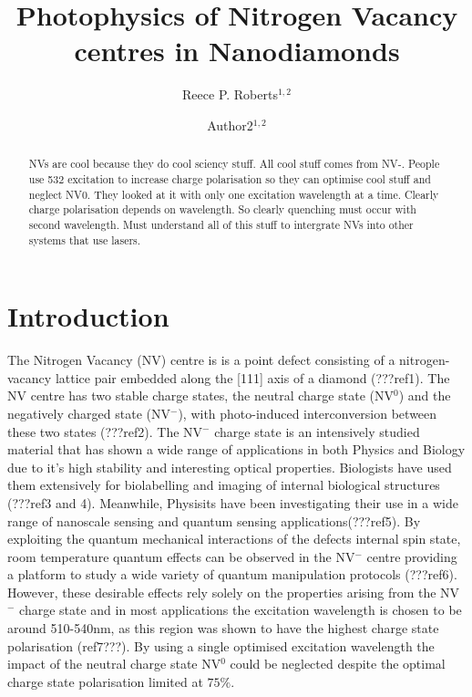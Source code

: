 \documentclass[preprint,prl,twocolumn]{revtex4}
\begin{document}
\title{Photophysics of Nitrogen Vacancy centres in Nanodiamonds}
  
\author{Reece P. Roberts$^{1,2}$}
\author{Author2$^{1,2}$}



\begin{abstract}
NVs are cool because they do cool sciency stuff.
All cool stuff comes from NV-.
People use 532 excitation to increase charge polarisation so they can optimise cool stuff and neglect NV0.
They looked at it with only one excitation wavelength at a time. 
Clearly charge polarisation depends on wavelength.
So clearly quenching must occur with second wavelength.
Must understand all of this stuff to intergrate NVs into other systems that use lasers.
\end{abstract}

\maketitle

\section{Introduction}
The Nitrogen Vacancy (NV) centre is is a point defect consisting of a nitrogen-vacancy lattice pair embedded along the [111] axis of a diamond (???ref1). The NV centre has two stable charge states, the neutral charge state (NV$^0$) and the negatively charged state (NV$^-$), with photo-induced interconversion between these two states (???ref2). The NV$^-$ charge state is an intensively studied material that has shown a wide range of applications in both Physics and Biology due to it's high stability and interesting optical properties. Biologists have used them extensively for biolabelling and imaging of internal biological structures (???ref3 and 4). Meanwhile, Physisits have been investigating their use in a wide range of nanoscale sensing and quantum sensing applications(???ref5). By exploiting the quantum mechanical interactions of the defects internal spin state, room temperature quantum effects can be observed in the NV$^-$ centre providing a platform to study a wide variety of quantum manipulation protocols (???ref6). However, these desirable effects rely solely on the properties arising from the NV$^-$ charge state and in most applications the excitation wavelength is chosen to be around 510-540nm, as this region was shown to have the highest charge state polarisation (ref7???). By using a single optimised excitation wavelength the impact of the neutral charge state NV$^0$ could be neglected despite the optimal charge state polarisation limited at $75\%$. 
\end{document}
